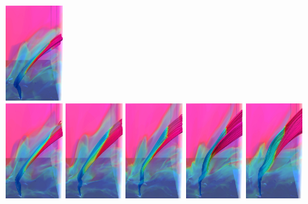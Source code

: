 \documentclass{aa}
\begin{document}
{\begin{figure}[!h]
\begin{minipage}{12cm}
\includegraphics[width=0.19\textwidth]{figures2/subset_logT_74.pdf}\\
\includegraphics[width=0.19\textwidth]{figures2/subset_logT_76.pdf}
\includegraphics[width=0.19\textwidth]{figures2/subset_logT_78.pdf}
\includegraphics[width=0.19\textwidth]{figures2/subset_logT_80.pdf}
\includegraphics[width=0.19\textwidth]{figures2/subset_logT_82.pdf}
\includegraphics[width=0.19\textwidth]{figures2/subset_logT_84.pdf}

\end{minipage}
\end{figure}}
\end{document}
